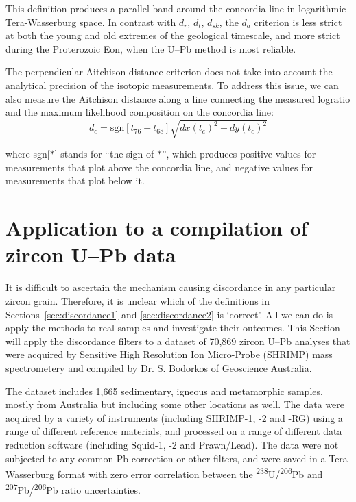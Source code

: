 \documentclass{article}
\begin{document}
This definition produces a parallel band around the concordia line in
logarithmic Tera-Wasserburg space. In contrast with $d_r$, $d_t$,
$d_{sk}$, the $d_a$ criterion is less strict at both the young and old
extremes of the geological timescale, and more strict during the
Proterozoic Eon, when the U--Pb method is most reliable.

The perpendicular Aitchison distance criterion does not take into
account the analytical precision of the isotopic measurements.  To
address this issue, we can also measure the Aitchison distance along a
line connecting the measured logratio and the maximum likelihood
composition on the concordia line:
\begin{equation}
  d_c = \mbox{sgn}[t_{76}-t_{68}] \sqrt{ dx(t_c)^2 + dy(t_c)^2 }
  \label{eq:da}
\end{equation}

\noindent where sgn[$\ast$] stands for ``the sign of $\ast$'', which
produces positive values for measurements that plot above the
concordia line, and negative values for measurements that plot below
it.

\section{Application to a compilation of zircon U--Pb data}
\label{sec:application}

It is difficult to ascertain the mechanism causing discordance in any
particular zircon grain. Therefore, it is unclear which of the
definitions in Sections~\ref{sec:discordance1} and
\ref{sec:discordance2} is `correct'. All we can do is apply the
methods to real samples and investigate their outcomes. This Section
will apply the discordance filters to a dataset of 70,869 zircon U--Pb
analyses that were acquired by Sensitive High Resolution Ion
Micro-Probe (SHRIMP) mass spectrometery and compiled by Dr. S.
Bodorkos of Geoscience Australia.

The dataset includes 1,665 sedimentary, igneous and metamorphic
samples, mostly from Australia but including some other locations as
well.  The data were acquired by a variety of instruments (including
SHRIMP-1, -2 and -RG) using a range of different reference materials,
and processed on a range of different data reduction software
(including Squid-1, -2 and Prawn/Lead). The data were not subjected to
any common Pb correction or other filters, and were saved in a
Tera-Wasserburg format with zero error correlation between the
\textsuperscript{238}U/\textsuperscript{206}Pb and
\textsuperscript{207}Pb/\textsuperscript{206}Pb ratio uncertainties.
\end{document}

